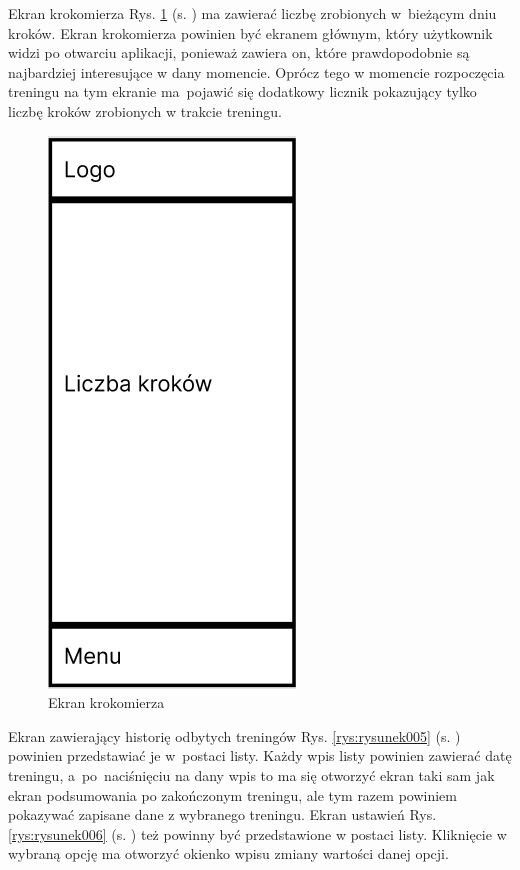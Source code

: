Ekran krokomierza Rys. \ref{rys:rysunek003} (s. \pageref{rys:rysunek003}) ma zawierać liczbę zrobionych w~bieżącym dniu kroków. Ekran krokomierza powinien być ekranem głównym, który użytkownik widzi po otwarciu aplikacji, ponieważ zawiera on, które prawdopodobnie są najbardziej interesujące w dany momencie. Oprócz tego w momencie rozpoczęcia treningu na tym ekranie ma~pojawić się dodatkowy licznik pokazujący tylko liczbę kroków zrobionych w trakcie treningu.

\begin{figure}[!htb]
	\centering
	\includegraphics[width=.2\linewidth]{rys/ekran_krokomierza.png}
	\caption{Ekran krokomierza}
	\label{rys:rysunek003}
\end{figure}

Ekran zawierający historię odbytych treningów Rys. \ref{rys:rysunek005} (s. \pageref{rys:rysunek005}) powinien przedstawiać je w~postaci listy. Każdy wpis listy powinien zawierać datę treningu, a~po~naciśnięciu na dany wpis to ma się otworzyć ekran taki sam jak ekran podsumowania po zakończonym treningu, ale tym razem powiniem pokazywać zapisane dane z wybranego treningu. Ekran ustawień Rys. \ref{rys:rysunek006} (s. \pageref{rys:rysunek006}) też powinny być przedstawione w postaci listy. Kliknięcie w wybraną opcję ma otworzyć okienko wpisu zmiany wartości danej opcji.

